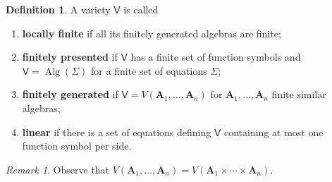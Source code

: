 \documentclass{amsart}
\theoremstyle{plain}
\theoremstyle{definition}
\newtheorem{definition}[theorem]{Definition}
\theoremstyle{remark}
\newtheorem{remark}[theorem]{Remark}
\DeclareMathOperator{\Alg}{Alg}
\begin{document}
\begin{definition}
    A variety $\mathsf{V}$ is called 
    \begin{enumerate}
    \item \textbf{locally finite} if all its finitely generated algebras are finite; 
    \item \textbf{finitely presented} if $\mathsf{V}$ has a finite set of function symbols and $\mathsf{V}= \Alg(\Sigma)$ for a finite set of equations $\Sigma$; 
    \item \textbf{finitely generated} if $\mathsf{V}=V(\mathbf{A}_1, \ldots, \mathbf{A}_n)$ for $\mathbf{A}_1, \ldots, \mathbf{A}_n$ finite similar algebras; 
    \item \textbf{linear} if there is a set of equations defining $\mathsf{V}$ containing at most one function symbol per side. 
    \end{enumerate}
\end{definition}

\begin{remark}
    Observe that $V(\mathbf{A}_1, \ldots, \mathbf{A}_n)=V(\mathbf{A}_1 \times \cdots \times \mathbf{A}_n)$.  
\end{remark}
\end{document}
